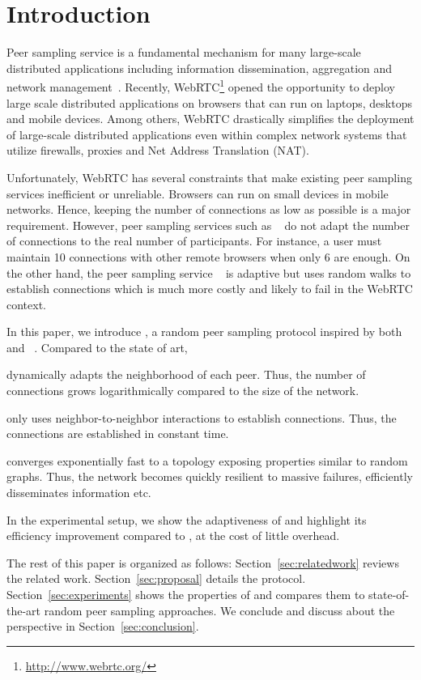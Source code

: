 
\section{Introduction}

Peer sampling service is a fundamental mechanism for many large-scale
distributed applications including information dissemination, aggregation and
network management~\cite{jelasity2007gossip}. Recently,
WebRTC\footnote{\url{http://www.webrtc.org/}} opened the opportunity to deploy
large scale distributed applications on browsers that can run on laptops,
desktops and mobile devices. Among others, WebRTC drastically simplifies
the deployment of large-scale distributed applications even within complex
network systems that utilize firewalls, proxies and Net Address Translation
(NAT).

Unfortunately, WebRTC has several constraints that make existing peer
sampling services inefficient or unreliable. Browsers can run
on small devices in mobile networks. Hence, keeping the number of
connections as low as possible is a major requirement. However, peer
sampling services such as \CYCLON~\cite{voulgaris2005cyclon} do not
adapt the number of connections to the real number of
participants. For instance, a user must maintain 10 connections with
other remote browsers when only 6 are enough. On the other hand, the
peer sampling service \SCAMP~\cite{ganesh2003peer} is adaptive but
uses random walks to establish connections which is much more
costly and likely to fail in the WebRTC context.

In this paper, we introduce \SPRAY, a random peer sampling protocol inspired
by both \CYCLON~\cite{voulgaris2005cyclon} and
\SCAMP~\cite{ganesh2003peer}. Compared to the state of art,
\begin{inparaenum}[(i)]
\item \SPRAY dynamically adapts the neighborhood of each peer. Thus, the number
  of connections grows logarithmically compared to the size of the network.
\item \SPRAY only uses neighbor-to-neighbor interactions to establish
  connections. Thus, the connections are established in constant time.
\item \SPRAY converges exponentially fast to a topology exposing properties
  similar to random graphs. Thus, the network becomes quickly resilient to
  massive failures, efficiently disseminates information etc.
\item In the experimental setup, we show the adaptiveness of \SPRAY and
  highlight its efficiency improvement compared to \CYCLON, at the cost of
  little overhead.
\end{inparaenum}

The rest of this paper is organized as follows: Section~\ref{sec:relatedwork}
reviews the related work. Section~\ref{sec:proposal} details the \SPRAY
protocol. Section~\ref{sec:experiments} shows the properties of \SPRAY
and compares them to state-of-the-art random peer sampling approaches. We
conclude and discuss about the perspective in Section~\ref{sec:conclusion}.

